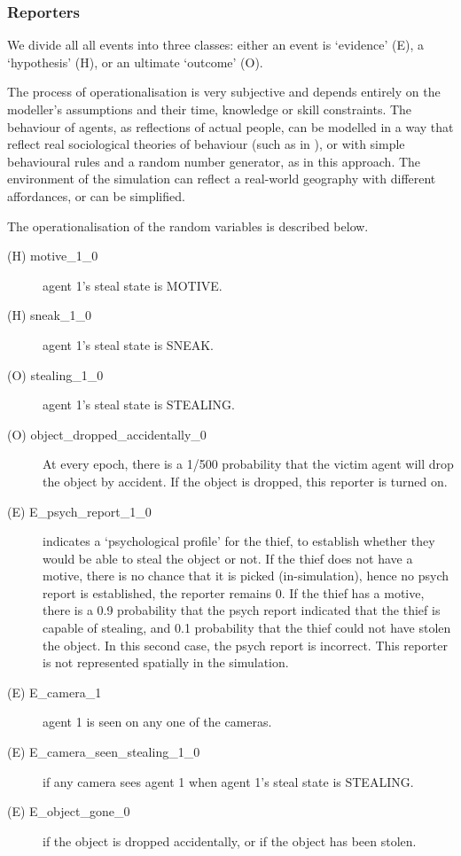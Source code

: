 \documentclass[12pt]{article}
\begin{document}
\subsubsection{Reporters}
We divide all all events into three classes: either an event is `evidence' (E), a `hypothesis' (H), or an ultimate `outcome' (O). 

The process of operationalisation is very subjective and depends entirely on the modeller's assumptions and their time, knowledge or skill constraints. The behaviour of agents, as reflections of actual people, can be modelled in a way that reflect real sociological theories of behaviour (such as in \citet{Gerritsen2015}), or with simple behavioural rules and a random number generator, as in this approach. The environment of the simulation can reflect a real-world geography with different affordances, or can be simplified. 

The operationalisation of the random variables is described below. 
\begin{description}
\item[(H) motive\_1\_0 ] agent 1's steal state is MOTIVE.
\item[(H) sneak\_1\_0 ] agent 1's steal state is SNEAK.
\item[(O) stealing\_1\_0 ] agent 1's steal state is STEALING.
\item[(O) object\_dropped\_accidentally\_0 ] At every epoch, there is a 1/500 probability that the victim agent will drop the object by accident. If the object is dropped, this reporter is turned on.
\item[(E) E\_psych\_report\_1\_0 ] indicates a `psychological profile' for the thief, to establish whether they would be able to steal the object or not. If the thief does not have a motive, there is no chance that it is picked (in-simulation), hence no psych report is established, the reporter remains 0. If the thief has a motive, there is a 0.9 probability that the psych report indicated that the thief is capable of stealing, and 0.1 probability that the thief could not have stolen the object. In this second case, the psych report is incorrect. This reporter is not represented spatially in the simulation.
\item[(E) E\_camera\_1 ] agent 1 is seen on any one of the cameras.
\item[(E) E\_camera\_seen\_stealing\_1\_0 ]  if any camera sees agent 1 when agent 1's steal state is STEALING.
\item[(E) E\_object\_gone\_0 ] if the object is dropped accidentally, or if the object has been stolen.
\end{description}
\end{document}
